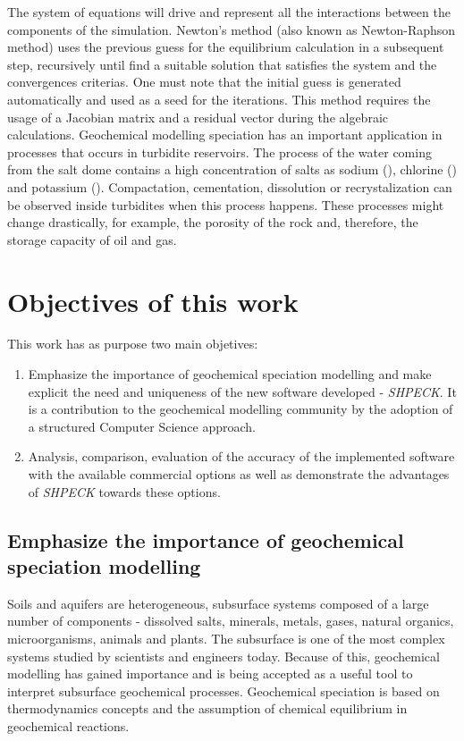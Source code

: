 \documentclass[ppgc,mestrado,english]{iiufrgs}
\begin{document}

The system of equations will drive and represent all the interactions between the components of the simulation. Newton's method (also known as Newton-Raphson method) uses the previous guess for the equilibrium calculation in a subsequent step, recursively until find a suitable solution that satisfies the system and the convergences criterias. One must note that the initial guess is generated automatically and used as a seed for the iterations. This method requires the usage of a Jacobian matrix and a residual vector during the algebraic calculations. Geochemical modelling speciation has an important application in processes that occurs in turbidite reservoirs. The process of the water coming from the salt dome contains a high concentration of salts as sodium (), chlorine () and potassium (). Compactation, cementation, dissolution or recrystalization can be observed inside turbidites when this process happens. These processes might change drastically, for example, the porosity of the rock and, therefore, the storage capacity of oil and gas.

\section{Objectives of this work}
This work has as purpose two main objetives:
\begin{enumerate}
\item Emphasize the importance of geochemical speciation modelling and make explicit the need and uniqueness of the new software developed - \emph{SHPECK}. It is a contribution to the geochemical modelling community by the adoption of a structured Computer Science approach.
\item Analysis, comparison, evaluation of the accuracy of the implemented software with the available commercial options as well as demonstrate the advantages of \emph{SHPECK} towards these options.
\end{enumerate}
\subsection{Emphasize the importance of geochemical speciation modelling}
Soils and aquifers are heterogeneous, subsurface systems composed of a large number of components - dissolved salts, minerals, metals, gases, natural organics, microorganisms, animals and plants. The subsurface is one of the most complex systems studied by scientists and engineers today. Because of this, geochemical modelling has gained importance and is being accepted as a useful tool to interpret subsurface geochemical processes. Geochemical speciation is based on thermodynamics concepts and the assumption of chemical equilibrium in geochemical reactions.
\end{document}
